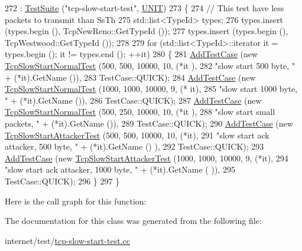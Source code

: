 \begin{DoxyCode}
272                            : \hyperlink{classns3_1_1TestSuite_a904b0c40583b744d30908aeb94636d1a}{TestSuite} (\textcolor{stringliteral}{"tcp-slow-start-test"}, \hyperlink{classns3_1_1TestSuite_a1ebfcab34ec8161e085e8e3a1855eae0a3885375a3787abf60431f8454b3cadbd}{UNIT})
273   \{
274     \textcolor{comment}{// This test have less packets to transmit than SsTh}
275     std::list<TypeId> types;
276     types.insert (types.begin (), TcpNewReno::GetTypeId ());
277     types.insert (types.begin (), TcpWestwood::GetTypeId ());
278 
279     \textcolor{keywordflow}{for} (std::list<TypeId>::iterator it = types.begin (); it != types.end (); ++it)
280       \{
281         \hyperlink{classns3_1_1TestCase_a3718088e3eefd5d6454569d2e0ddd835}{AddTestCase} (\textcolor{keyword}{new} \hyperlink{classTcpSlowStartNormalTest}{TcpSlowStartNormalTest} (500, 500, 10000, 10, (*it
      ),
282                                                  \textcolor{stringliteral}{"slow start 500 byte, "} + (*it).GetName ()),
283                      TestCase::QUICK);
284         \hyperlink{classns3_1_1TestCase_a3718088e3eefd5d6454569d2e0ddd835}{AddTestCase} (\textcolor{keyword}{new} \hyperlink{classTcpSlowStartNormalTest}{TcpSlowStartNormalTest} (1000, 1000, 10000, 9, (*
      it),
285                                                  \textcolor{stringliteral}{"slow start 1000 byte, "} + (*it).GetName ()),
286                      TestCase::QUICK);
287         \hyperlink{classns3_1_1TestCase_a3718088e3eefd5d6454569d2e0ddd835}{AddTestCase} (\textcolor{keyword}{new} \hyperlink{classTcpSlowStartNormalTest}{TcpSlowStartNormalTest} (500, 250, 10000, 10, (*it
      ),
288                                                  \textcolor{stringliteral}{"slow start small packets, "} + (*it).GetName ()),
289                      TestCase::QUICK);
290         \hyperlink{classns3_1_1TestCase_a3718088e3eefd5d6454569d2e0ddd835}{AddTestCase} (\textcolor{keyword}{new} \hyperlink{classTcpSlowStartAttackerTest}{TcpSlowStartAttackerTest} (500, 500, 10000, 10, 
      (*it),
291                                                    \textcolor{stringliteral}{"slow start ack attacker, 500 byte, "} + (*it).GetName ()
      ),
292                      TestCase::QUICK);
293         \hyperlink{classns3_1_1TestCase_a3718088e3eefd5d6454569d2e0ddd835}{AddTestCase} (\textcolor{keyword}{new} \hyperlink{classTcpSlowStartAttackerTest}{TcpSlowStartAttackerTest} (1000, 1000, 10000, 9,
       (*it),
294                                                    \textcolor{stringliteral}{"slow start ack attacker, 1000 byte, "} + (*it).GetName (
      )),
295                      TestCase::QUICK);
296       \}
297   \}
\end{DoxyCode}


Here is the call graph for this function\+:




The documentation for this class was generated from the following file\+:\begin{DoxyCompactItemize}
\item 
internet/test/\hyperlink{tcp-slow-start-test_8cc}{tcp-\/slow-\/start-\/test.\+cc}\end{DoxyCompactItemize}
